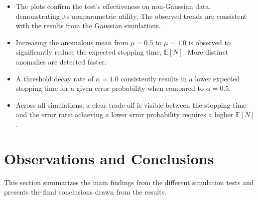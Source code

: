 \begin{itemize}
    \item The plots confirm the test's effectiveness on non-Gaussian data, demonstrating its nonparametric utility. The observed trends are consistent with the results from the Gaussian simulations.
    
    \item Increasing the anomalous mean from $\mu=0.5$ to $\mu=1.0$ is observed to significantly reduce the expected stopping time, $\mathbb{E}[N]$. More distinct anomalies are detected faster.
    
    \item A threshold decay rate of $\alpha=1.0$ consistently results in a lower expected stopping time for a given error probability when compared to $\alpha=0.5$.
    
    \item Across all simulations, a clear trade-off is visible between the stopping time and the error rate: achieving a lower error probability requires a higher $\mathbb{E}[N]$.
\end{itemize}


\section{Observations and Conclusions}
This section summarizes the main findings from the different simulation tests and presents the final conclusions drawn from the results.

